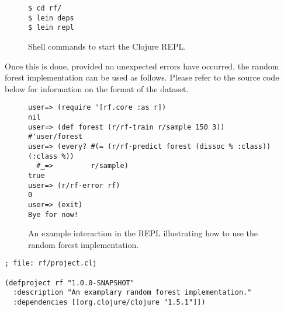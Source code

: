 \documentclass[a4paper,man,12pt,apacite,floatsintext,draftfirst]{apa6} %
\begin{document}
\begin{figure}[H]
\caption{Shell commands to start the Clojure REPL.}
\begin{verbatim}
$ cd rf/
$ lein deps
$ lein repl
\end{verbatim}
\end{figure}

Once this is done, provided no unexpected errors have occurred,
the random forest implementation can be used as follows.
Please refer to the source code below for information on the
format of the dataset.

\begin{figure}[H]
\caption{An example interaction in the REPL illustrating how to use the random forest implementation.}
\begin{verbatim}
user=> (require '[rf.core :as r])
nil
user=> (def forest (r/rf-train r/sample 150 3))
#'user/forest
user=> (every? #(= (r/rf-predict forest (dissoc % :class)) (:class %))
  #_=>         r/sample)
true
user=> (r/rf-error rf)
0
user=> (exit)
Bye for now!
\end{verbatim}
\end{figure}

\newpage
\begin{verbatim}
; file: rf/project.clj

(defproject rf "1.0.0-SNAPSHOT"
  :description "An examplary random forest implementation."
  :dependencies [[org.clojure/clojure "1.5.1"]])
\end{verbatim}
\end{document}
